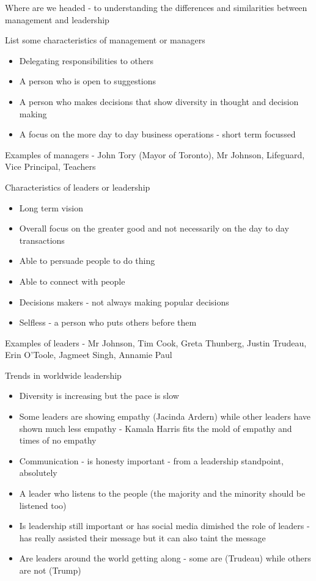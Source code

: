 \documentclass[11pt]{article}
\begin{document}
Where are we headed - to understanding the differences and similarities between management and leadership

List some characteristics of management or managers
\begin{itemize}
    \item Delegating responsibilities to others
    \item A person who is open to suggestions
    \item A person who makes decisions that show diversity in thought and decision making
    \item A focus on the more day to day business operations - short term focussed
\end{itemize}

Examples of managers - John Tory (Mayor of Toronto), Mr Johnson, Lifeguard, Vice Principal, Teachers

Characteristics of leaders or leadership

\begin{itemize}
    \item Long term vision
    \item Overall focus on the greater good and not necessarily on the day to day transactions
    \item Able to persuade people to do thing
    \item Able to connect with people
    \item Decisions makers - not always making popular decisions
    \item Selfless - a person who puts others before them
\end{itemize}

Examples of leaders - Mr Johnson, Tim Cook, Greta Thunberg, Justin Trudeau, Erin O'Toole, Jagmeet Singh, Annamie Paul

Trends in worldwide leadership

\begin{itemize}
    \item Diversity is increasing but the pace is slow
    \item Some leaders are showing empathy (Jacinda Ardern) while other leaders have shown much less empathy - Kamala Harris fits the mold of empathy and times of no empathy
    \item Communication - is honesty important - from a leadership standpoint, absolutely
    \item A leader who listens to the people (the majority and the minority should be listened too)
    \item Is leadership still important or has social media dimished the role of leaders - has really assisted their message but it can also taint the message
    \item Are leaders around the world getting along - some are (Trudeau) while others are not (Trump)
\end{itemize}
\end{document}
